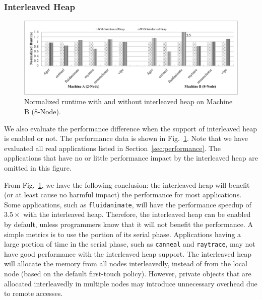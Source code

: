 \subsubsection{Interleaved Heap} 
\label{sec:interleavedheap}

\begin{figure}[H]
    \centering
    \includegraphics[width=\textwidth]{figure/interleavedheap.pdf}
    \caption{Normalized runtime with  and without interleaved heap on Machine B (8-Node).\label{fig:interleavedheap}}  
\end{figure}

We also evaluate the performance difference when the support of interleaved heap is enabled or not. The performance data is shown in Fig.~\ref{fig:interleavedheap}. Note that we have evaluated all real applications listed in Section~\ref{sec:performance}. The applications that have no or little performance impact by the interleaved heap are omitted in this figure. 

From Fig.~\ref{fig:interleavedheap}, we have the following conclusion: the interleaved heap will benefit (or at least cause no harmful impact) the performance for most applications. Some applications, such as \texttt{fluidanimate}, will have the performance speedup of $3.5\times$ with the interleaved heap. Therefore, the interleaved heap can be enabled by default, unless programmers know that it will not benefit the performance. A simple metrics is to use the portion of its serial phase. Applications having a large portion of time in the serial phase, such as \texttt{canneal} and \texttt{raytrace}, may not have good performance with the interleaved heap support. The interleaved heap will allocate the memory from all nodes interleavedly, instead of from the local node (based on the default first-touch policy). However, private objects that are allocated interleavedly in multiple nodes may introduce unnecessary overhead due to remote accesses. 


